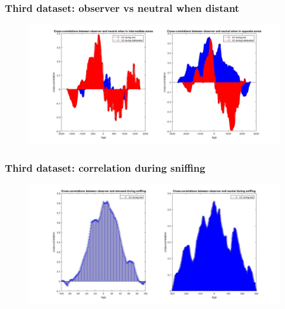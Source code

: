\documentclass{beamer}
\begin{document}
\begin{frame}
\frametitle{Third dataset: observer vs neutral when distant}



\begin{figure}[H]
	\begin{center}
		\hspace*{-1cm}
		\includegraphics[scale=.30]{obs_neut_distant.jpg} 
	\end{center}  
	
	
\end{figure}

\end{frame}

\begin{frame}
\frametitle{Third dataset: correlation during sniffing}



\begin{figure}[H]
	\begin{center}
		\hspace*{-1cm}
		\includegraphics[scale=.30]{sniff3.jpg} 
	\end{center}  
	
	
\end{figure}

\end{frame}
\end{document}

